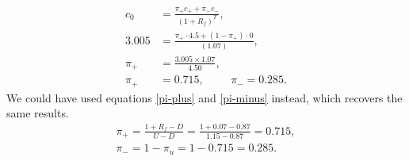 \documentclass[../notes_compiled.tex]{subfiles}
\begin{document}
\begin{itemize}
{\begin{align*}
c_{0} &=  \frac{\pi_{+}c_{+} + \pi_{-}c_{-}}{(1+R_{f})^{T}}, \\
3.005 &= \frac{\pi_{+}\cdot4.5 + (1-\pi_{+})\cdot0}{(1.07)}, \\
\pi_{+}&=\frac{3.005\times1.07}{4.50}, \\
\pi_{+}&=0.715, \hspace{1cm} \pi_{-}=0.285.
\end{align*}
We could have used equations \ref{pi-plus} and \ref{pi-minus} instead, which recovers the same results.
\begin{gather*}
\pi_{+}=\frac{1+R_{f}-D}{U-D}=\frac{1+0.07-0.87}{1.15-0.87}=0.715, \\
\pi_{-}=1-\pi_{u}=1-0.715=0.285.
\end{gather*}
}
\end{itemize}
\end{document}
